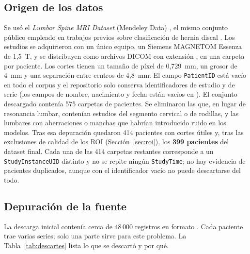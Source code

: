 \subsection{Origen de los datos}
Se usó el \emph{Lumbar Spine MRI Dataset} (Mendeley Data) \cite{sudirman2019}, el mismo conjunto público empleado en trabajos previos sobre clasificación de hernia discal \cite{sari2024}. Los estudios se adquirieron con un único equipo, un Siemens MAGNETOM Essenza de 1,5~T, y se distribuyen como archivos DICOM con extensión , en una carpeta por paciente. Los cortes tienen un tamaño de píxel de 0,729~mm, un grosor de 4~mm y una separación entre centros de 4,8~mm. El campo \texttt{PatientID} está vacío en todo el corpus y el repositorio solo conserva identificadores de estudio y de serie (los campos de nombre, nacimiento y fecha están vacíos en ). El conjunto descargado contenía 575 carpetas de pacientes. Se eliminaron las que, en lugar de resonancia lumbar, contenían estudios del segmento cervical o de rodillas, y las lumbares con aberraciones o manchas que habrían introducido ruido en los modelos. Tras esa depuración quedaron 414 pacientes con cortes útiles y, tras las exclusiones de calidad de los ROI (Sección~\ref{sec:roi}), los \textbf{399 pacientes} del dataset final. Cada una de las 414 carpetas restantes corresponde a un \texttt{StudyInstanceUID} distinto y no se repite ningún \texttt{StudyTime}; no hay evidencia de pacientes duplicados, aunque con el identificador vacío no puede descartarse del todo.

\subsection{Depuración de la fuente}
La descarga inicial contenía cerca de 48\,000 registros en formato . Cada paciente trae varias series; solo una parte sirve para este problema. La Tabla~\ref{tab:descartes} lista lo que se descartó y por qué.

